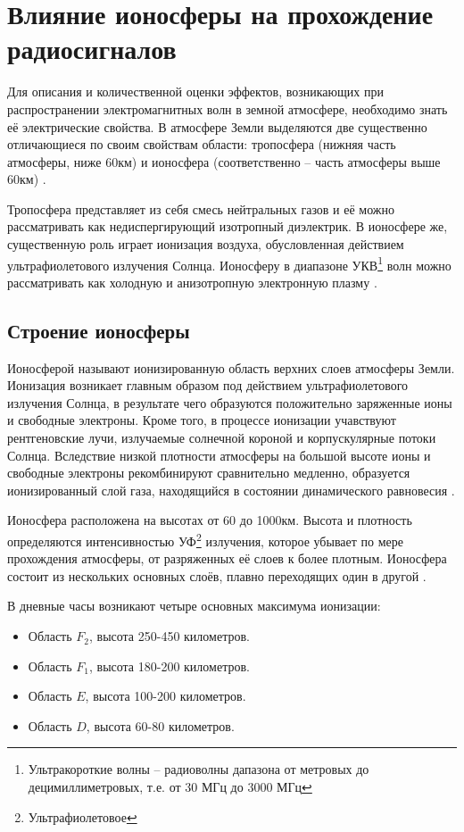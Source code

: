 \chapter{Влияние ионосферы на прохождение радиосигналов}

Для описания и количественной оценки эффектов, возникающих при распространении электромагнитных волн в земной
атмосфере, необходимо знать её электрические свойства. В атмосфере Земли выделяются две существенно отличающиеся по
своим свойствам области: тропосфера (нижняя часть атмосферы, ниже 60км) и ионосфера (соответственно -- часть
атмосферы выше 60км) \cite{Kravcov}.

Тропосфера представляет из себя смесь нейтральных газов и её можно рассматривать как недиспергирующий изотропный
диэлектрик. В ионосфере же, существенную роль играет ионизация воздуха, обусловленная действием ультрафиолетового
излучения Солнца. Ионосферу в диапазоне УКВ\footnote{Ультракороткие волны -- радиоволны дапазона от метровых до
децимиллиметровых, т.е. от 30 МГц до 3000 МГц} волн можно рассматривать как холодную и анизотропную электронную
плазму \cite{Kravcov}.

\section{Строение ионосферы}

Ионосферой называют ионизированную область верхних слоев атмосферы Земли. Ионизация возникает главным образом под
действием ультрафиолетового излучения Солнца, в результате чего образуются положительно заряженные ионы и свободные
электроны. Кроме того, в процессе ионизации учавствуют рентгеновские лучи, излучаемые солнечной короной и
корпускулярные потоки Солнца. Вследствие низкой плотности атмосферы на большой высоте ионы и свободные электроны
рекомбинируют сравнительно медленно, образуется ионизированный слой газа, находящийся в состоянии динамического равновесия \cite{Kravcov}.

Ионосфера расположена на высотах от 60 до 1000км. Высота и плотность определяются интенсивностью 
УФ\footnote{Ультрафиолетовое} излучения, которое убывает по мере прохождения атмосферы, от разряженных её слоев к
более плотным. Ионосфера состоит из нескольких основных слоёв, плавно переходящих один в другой \cite{Kravcov}.

В дневные часы возникают четыре основных максимума ионизации:
\begin{itemize}
	\item Область $F_2$, высота 250-450 километров.
	\item Область $F_1$, высота 180-200 километров.
	\item Область $E$, высота 100-200 километров.
	\item Область $D$, высота 60-80 километров.
\end{itemize}

